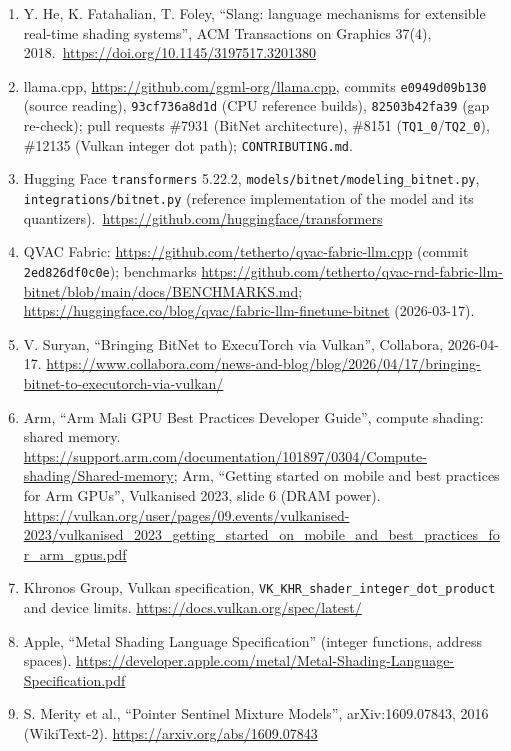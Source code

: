 \documentclass[
  10pt,
]{article}
\begin{document}
\begin{enumerate}
  W. M. McKeeman, ``Differential Testing for Software'', Digital
  Technical Journal 10(1), 100-107, 1998.
\item
  Y. He, K. Fatahalian, T. Foley, ``Slang: language mechanisms for
  extensible real-time shading systems'', ACM Transactions on Graphics
  37(4), 2018.\ \url{https://doi.org/10.1145/3197517.3201380}
\item
  llama.cpp, \url{https://github.com/ggml-org/llama.cpp}, commits
  \texttt{e0949d09b130} (source reading), \texttt{93cf736a8d1d} (CPU
  reference builds), \texttt{82503b42fa39} (gap re-check); pull requests
  \#7931 (BitNet architecture), \#8151
  (\texttt{TQ1\_0}/\texttt{TQ2\_0}), \#12135 (Vulkan integer dot path);
  \texttt{CONTRIBUTING.md}.
\item
  Hugging Face \texttt{transformers} 5.22.2,
  \texttt{models/bitnet/modeling\_bitnet.py},
  \texttt{integrations/bitnet.py} (reference implementation of the model
  and its quantizers).\ \url{https://github.com/huggingface/transformers}
\item
  QVAC Fabric: \url{https://github.com/tetherto/qvac-fabric-llm.cpp}
  (commit \texttt{2ed826df0c0e}); benchmarks
  \url{https://github.com/tetherto/qvac-rnd-fabric-llm-bitnet/blob/main/docs/BENCHMARKS.md};
  \url{https://huggingface.co/blog/qvac/fabric-llm-finetune-bitnet}
  (2026-03-17).
\item
  V. Suryan, ``Bringing BitNet to ExecuTorch via Vulkan'', Collabora,
  2026-04-17.
  \url{https://www.collabora.com/news-and-blog/blog/2026/04/17/bringing-bitnet-to-executorch-via-vulkan/}
\item
  Arm, ``Arm Mali GPU Best Practices Developer Guide'', compute shading:
  shared memory.
  \url{https://support.arm.com/documentation/101897/0304/Compute-shading/Shared-memory};
  Arm, ``Getting started on mobile and best practices for Arm GPUs'',
  Vulkanised 2023, slide 6 (DRAM power).
  \url{https://vulkan.org/user/pages/09.events/vulkanised-2023/vulkanised_2023_getting_started_on_mobile_and_best_practices_for_arm_gpus.pdf}
\item
  Khronos Group, Vulkan specification,
  \texttt{VK\_KHR\_shader\_integer\_dot\_product} and device limits.
  \url{https://docs.vulkan.org/spec/latest/}
\item
  Apple, ``Metal Shading Language Specification'' (integer functions,
  address spaces).
  \url{https://developer.apple.com/metal/Metal-Shading-Language-Specification.pdf}
\item
  S. Merity et al., ``Pointer Sentinel Mixture Models'',
  arXiv:1609.07843, 2016 (WikiText-2).
  \url{https://arxiv.org/abs/1609.07843}
\end{enumerate}
\end{document}
